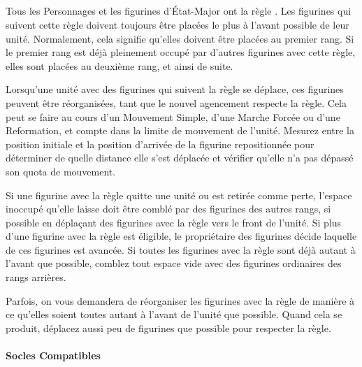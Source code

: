 \subsection{\frontrank}
\label{front_rank}

Tous les Personnages et les figurines d'État-Major ont la règle \frontrank{}. Les figurines qui suivent cette règle doivent toujours être placées le plus à l'avant possible de leur unité. Normalement, cela signifie qu'elles doivent être placées au premier rang. Si le premier rang est déjà pleinement occupé par d'autres figurines avec cette règle, elles sont placées au deuxième rang, et ainsi de suite.

Lorsqu'une unité avec des figurines qui suivent la règle \frontrank{} se déplace, ces figurines peuvent être réorganisées, tant que le nouvel agencement respecte la règle. Cela peut se faire au cours d'un Mouvement Simple, d'une Marche Forcée ou d'une Reformation, et compte dans la limite de mouvement de l'unité. Mesurez entre la position initiale et la position d'arrivée de la figurine repositionnée pour déterminer de quelle distance elle s'est déplacée et vérifier qu'elle n'a pas dépassé son quota de mouvement.

Si une figurine avec la règle \frontrank{} quitte une unité ou est retirée comme perte, l'espace inoccupé qu'elle laisse doit être comblé par des figurines des autres rangs, si possible en déplaçant des figurines avec la règle \frontrank{} vers le front de l'unité. Si plus d'une figurine avec la règle \frontrank{} est éligible, le propriétaire des figurines décide laquelle de ces figurines est avancée. Si toutes les figurines avec la règle \frontrank{} sont déjà autant à l'avant que possible, comblez tout espace vide avec des figurines ordinaires des rangs arrières.

Parfois, on vous demandera de réorganiser les figurines avec la règle \frontrank{} de manière à ce qu'elles soient toutes autant à l'avant de l'unité que possible. Quand cela se produit, déplacez aussi peu de figurines que possible pour respecter la règle.

\paragraph{Socles Compatibles}

